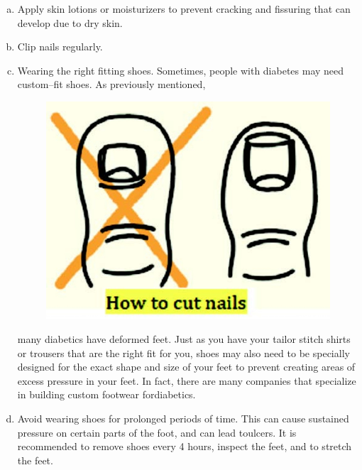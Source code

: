 \begin{enumerate}[a.]
\itemsep=0pt
\item Apply skin lotions or moisturizers to prevent cracking and fissuring that can develop due to dry skin.
\item Clip nails regularly.
\item Wearing the right fitting shoes. Sometimes, people with diabetes may need custom–fit shoes. As previously mentioned,
 \begin{figure}[h]
\centering
\includegraphics[scale=.8]{images/065.jpg}
\end{figure}
many diabetics have deformed feet. Just as you have your tailor stitch shirts or trousers that are the right fit for you, shoes may also need to be specially designed for the exact shape and size of your feet to prevent creating areas of excess pressure in your feet. In fact, there are many companies that specialize in building custom footwear for\break diabetics.
\item Avoid wearing shoes for prolonged periods of time. This can cause sustained pressure on certain parts of the foot, and can lead to\break ulcers. It is recommended to remove shoes every 4 hours, inspect the feet, and to stretch the feet.
\end{enumerate}

